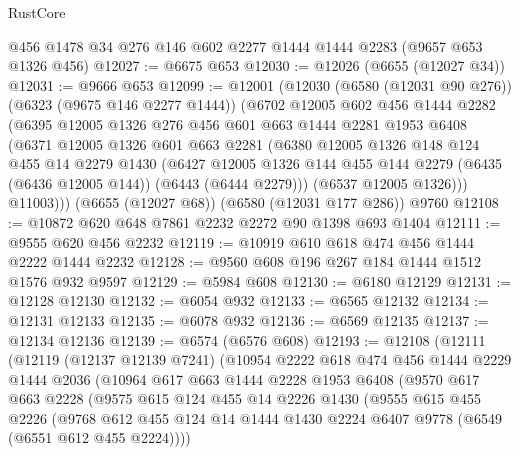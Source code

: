 \begin{lexlean}{RustCore}
\begin{coremodule}
    @456
    @1478
    @34
    @276
    @146
    @602
    @2277
    @1444
    @1444
    @2283
    (@9657 @653 @1326 @456)
@12027 := @6675 @653
@12030 := @12026 (@6655 (@12027 @34))
@12031 := @9666 @653
@12099 := @12001
    (@12030
      (@6580 (@12031 @90 @276))
      (@6323 (@9675 @146 @2277 @1444))
      (@6702
        @12005
        @602
        @456
        @1444
        @2282
        (@6395
          @12005
          @1326
          @276
          @456
          @601
          @663
          @1444
          @2281
          @1953
          @6408
          (@6371
            @12005
            @1326
            @601
            @663
            @2281
            (@6380
              @12005
              @1326
              @148
              @124
              @455
              @14
              @2279
              @1430
              (@6427
                @12005
                @1326
                @144
                @455
                @144
                @2279
                (@6435 (@6436 @12005 @144))
                (@6443 (@6444 @2279)))
              (@6537 @12005 @1326)))
          @11003)))
    (@6655 (@12027 @68))
    (@6580 (@12031 @177 @286))
    @9760
@12108 := @10872 @620 @648 @7861 @2232 @2272 @90 @1398 @693 @1404
@12111 := @9555 @620 @456 @2232
@12119 := @10919 @610 @618 @474 @456 @1444 @2222 @1444 @2232
@12128 := @9560 @608 @196 @267 @184 @1444 @1512 @1576 @932 @9597
@12129 := @5984 @608
@12130 := @6180 @12129
@12131 := @12128 @12130
@12132 := @6054 @932
@12133 := @6565 @12132
@12134 := @12131 @12133
@12135 := @6078 @932
@12136 := @6569 @12135
@12137 := @12134 @12136
@12139 := @6574 (@6576 @608)
@12193 := @12108
    (@12111
      (@12119
        (@12137 @12139 @7241)
        (@10954
          @2222
          @618
          @474
          @456
          @1444
          @2229
          @1444
          @2036
          (@10964
            @617
            @663
            @1444
            @2228
            @1953
            @6408
            (@9570
              @617
              @663
              @2228
              (@9575
                @615
                @124
                @455
                @14
                @2226
                @1430
                (@9555
                  @615
                  @455
                  @2226
                  (@9768
                    @612
                    @455
                    @124
                    @14
                    @1444
                    @1430
                    @2224
                    @6407
                    @9778
                    (@6549 (@6551 @612 @455 @2224))))

\end{coremodule}
\end{lexlean}
